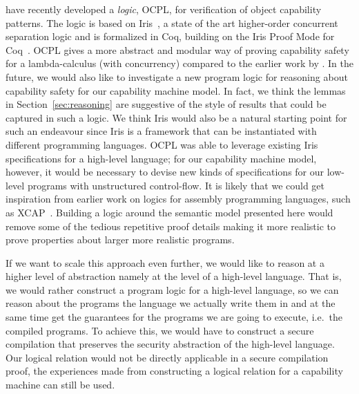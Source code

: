 \documentclass[format=acmsmall, review=true, screen=true]{acmart}
\newenvironment{toplas}%
    {\color{OliveGreen}}{}
\begin{document}
\citet{swasey:2017} have recently developed a \emph{logic}, OCPL, for verification
of object capability patterns. The logic is based on
Iris~\citep{iris,iris2,iris3}, a state of the art higher-order concurrent
separation logic and is formalized in Coq, building on the Iris Proof Mode for
Coq~\citep{ipm}. OCPL gives a more abstract and modular way of proving
capability safety for a lambda-calculus (with concurrency) compared to the
earlier work by \citet{Devriese:2016ObjCap}.
\begin{toplas}
In the future, we would also like to investigate a new program logic for
reasoning about capability safety for our capability machine model. In fact,
we think the lemmas in Section~\ref{sec:reasoning} are suggestive of the style
of results that could be captured in such a logic. We think Iris would also be
a natural starting point for such an endeavour since Iris is a
framework that can be instantiated with different programming languages. OCPL
was able to leverage existing Iris specifications for a high-level language;
for our capability machine model, however, it would be necessary to devise new
kinds of specifications for our low-level programs with unstructured
control-flow. It is likely that we could get inspiration from earlier work on
logics for assembly programming languages, such as XCAP~\citep{xcap}. Building a logic around the semantic model presented here would remove some of the tedious repetitive proof details making it more realistic to prove properties about larger more realistic programs.

If we want to scale this approach even further, we would like to reason at a
higher level of abstraction namely at the level of a high-level language.
That is, we would rather construct a program logic for a high-level language, so
we can reason about the programs the language we actually write them in and at
the same time get the guarantees for the programs we are going to execute, i.e.\
the compiled programs. To achieve this, we would have to construct a secure compilation that preserves the security abstraction of the high-level language. Our logical relation would not be directly applicable in a secure compilation proof, the experiences made from constructing a logical relation for a capability machine can still be used.
\end{toplas}
\end{document}
